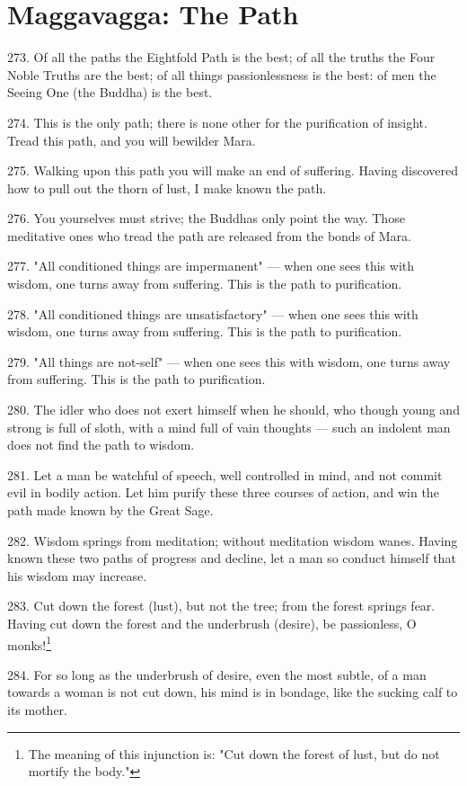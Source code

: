 \newpage
\chapter{Maggavagga: The Path}
273. Of all the paths the Eightfold Path is the best; of all the truths the Four Noble Truths are the best; of all things passionlessness is the best: of men the Seeing One (the Buddha) is the best.

274. This is the only path; there is none other for the purification of insight. Tread this path, and you will bewilder Mara.

275. Walking upon this path you will make an end of suffering. Having discovered how to pull out the thorn of lust, I make known the path.

276. You yourselves must strive; the Buddhas only point the way. Those meditative ones who tread the path are released from the bonds of Mara.

277. "All conditioned things are impermanent" — when one sees this with wisdom, one turns away from suffering. This is the path to purification.

278. "All conditioned things are unsatisfactory" — when one sees this with wisdom, one turns away from suffering. This is the path to purification.

279. "All things are not-self" — when one sees this with wisdom, one turns away from suffering. This is the path to purification.

280. The idler who does not exert himself when he should, who though young and strong is full of sloth, with a mind full of vain thoughts — such an indolent man does not find the path to wisdom.

281. Let a man be watchful of speech, well controlled in mind, and not commit evil in bodily action. Let him purify these three courses of action, and win the path made known by the Great Sage.

282. Wisdom springs from meditation; without meditation wisdom wanes. Having known these two paths of progress and decline, let a man so conduct himself that his wisdom may increase.

283. Cut down the forest (lust), but not the tree; from the forest springs fear. Having cut down the forest and the underbrush (desire), be passionless, O monks!\footnote{The meaning of this injunction is: "Cut down the forest of lust, but do not mortify the body."}

284. For so long as the underbrush of desire, even the most subtle, of a man towards a woman is not cut down, his mind is in bondage, like the sucking calf to its mother.

